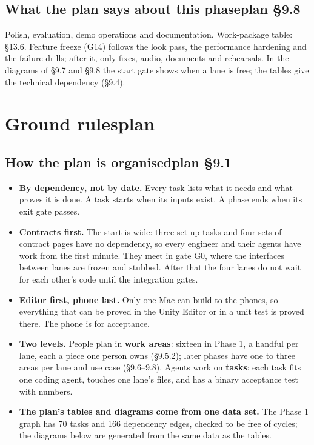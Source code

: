 \documentclass[10pt,a4paper,landscape]{article}
\newcommand{\planmark}[1]{{\normalfont\fontsize{7.5}{9}\selectfont\color{muted}\if\relax\detokenize{#1}\relax\else plan #1\fi}}
\newcommand{\sect}[2]{\section[#1]{#1\hfill\planmark{#2}}\markboth{#1}{#1}}
\newcommand{\sub}[2]{\subsection[#1]{#1\hfill\planmark{#2}}}
\begin{document}
\sub{What the plan says about this phase}{§9.8}
\begin{quoted}
Polish, evaluation, demo operations and documentation. Work-package table: §13.6. Feature freeze (G14) follows the look pass, the performance hardening and the failure drills; after it, only fixes, audio, documents and rehearsals. In the diagrams of §9.7 and §9.8 the start gate shows when a lane is free; the tables give the technical dependency (§9.4).\par
\end{quoted}


\clearpage\sect{Ground rules}{}\label{sec:rules}

\sub{How the plan is organised}{§9.1}
\begin{itemize}
  \item \textbf{By dependency, not by date.} Every task lists what it needs and what proves it is done. A task starts when its inputs exist. A phase ends when its exit gate passes.
  \item \textbf{Contracts first.} The start is wide: three set-up tasks and four sets of contract pages have no dependency, so every engineer and their agents have work from the first minute. They meet in gate G0, where the interfaces between lanes are frozen and stubbed. After that the four lanes do not wait for each other's code until the integration gates.
  \item \textbf{Editor first, phone last.} Only one Mac can build to the phones, so everything that can be proved in the Unity Editor or in a unit test is proved there. The phone is for acceptance.
  \item \textbf{Two levels.} People plan in \textbf{work areas}: sixteen in Phase 1, a handful per lane, each a piece one person owns (§9.5.2); later phases have one to three areas per lane and use case (§9.6–9.8). Agents work on \textbf{tasks}: each task fits one coding agent, touches one lane's files, and has a binary acceptance test with numbers.
  \item \textbf{The plan's tables and diagrams come from one data set.} The Phase 1 graph has 70 tasks and 166 dependency edges, checked to be free of cycles; the diagrams below are generated from the same data as the tables.
\end{itemize}
\end{document}
